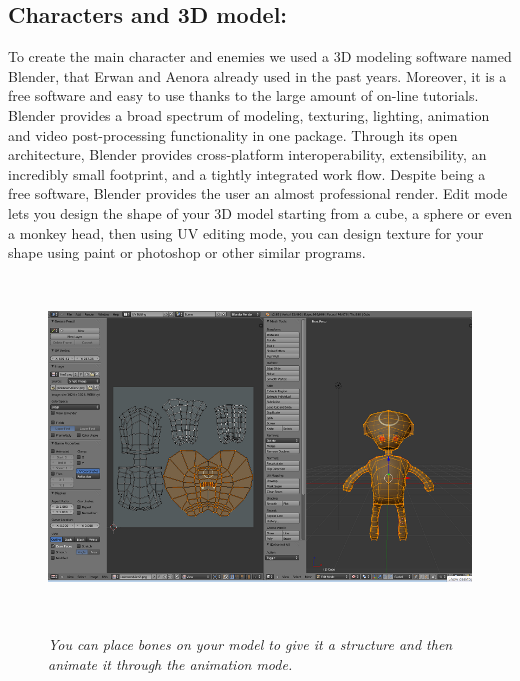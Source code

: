 \documentclass[article]{report} %
\begin{document}
 \subsection{Characters and 3D model:}
	To create the main character and enemies we used a 3D modeling software named Blender, that Erwan and Aenora already used in the past years.
Moreover, it is a free software and easy to use thanks to the large amount of on-line tutorials. Blender provides a broad spectrum of modeling, texturing, lighting, animation and video post-processing functionality in one package. Through its open architecture, Blender provides cross-platform interoperability, extensibility, an incredibly small footprint, and a tightly integrated work flow.
Despite being a free software, Blender provides the user an almost professional render. 
Edit mode lets you design the shape of your 3D model starting from a cube, a sphere or even a monkey head, then using UV editing mode, you can design texture for your shape using paint or photoshop or other similar programs.
			\begin{figure}[h]
				\includegraphics[width=14.5cm, height=9cm]{Images/Graphics/UV_edit.png}
				\begin{center}\it You can place bones on your model to give it a structure and then animate it through the animation mode. 							\end{center}	
			\end{figure}	
\end{document}
